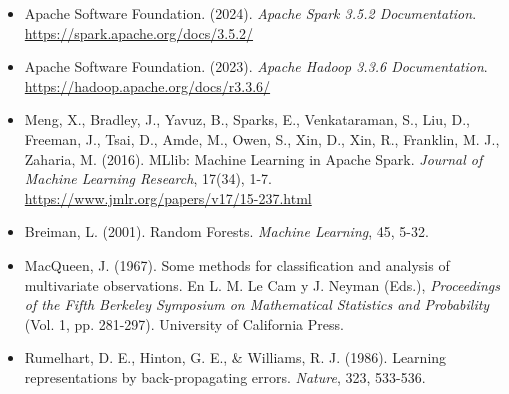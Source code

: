 \begin{itemize}
    \item Apache Software Foundation. (2024). \textit{Apache Spark 3.5.2 Documentation}. \url{https://spark.apache.org/docs/3.5.2/}
    \item Apache Software Foundation. (2023). \textit{Apache Hadoop 3.3.6 Documentation}. \url{https://hadoop.apache.org/docs/r3.3.6/}
    \item Meng, X., Bradley, J., Yavuz, B., Sparks, E., Venkataraman, S., Liu, D., Freeman, J., Tsai, D., Amde, M., Owen, S., Xin, D., Xin, R., Franklin, M. J., Zaharia, M. (2016). MLlib: Machine Learning in Apache Spark. \textit{Journal of Machine Learning Research}, 17(34), 1-7. \url{https://www.jmlr.org/papers/v17/15-237.html}
    \item Breiman, L. (2001). Random Forests. \textit{Machine Learning}, 45, 5-32.
    \item MacQueen, J. (1967). Some methods for classification and analysis of multivariate observations. En L. M. Le Cam y J. Neyman (Eds.), \textit{Proceedings of the Fifth Berkeley Symposium on Mathematical Statistics and Probability} (Vol. 1, pp. 281-297). University of California Press.
    \item Rumelhart, D. E., Hinton, G. E., \& Williams, R. J. (1986). Learning representations by back-propagating errors. \textit{Nature}, 323, 533-536.
\end{itemize}